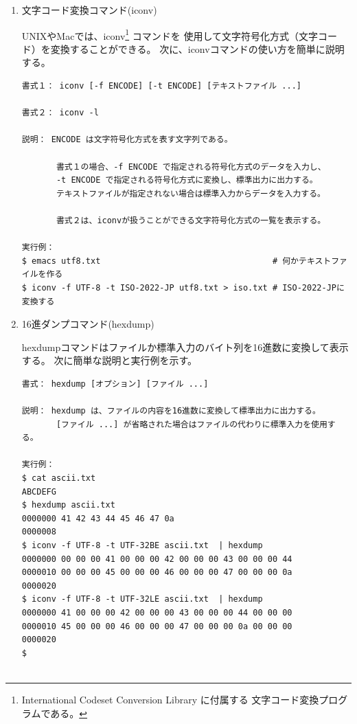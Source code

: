 \documentclass[a4j,dvipdfmx]{jarticle}
\begin{document}
\begin{enumerate}
\begin{enumerate}
\end{enumerate}

\newpage

\item 文字コード変換コマンド(iconv)

UNIXやMacでは、iconv\footnote{
International Codeset Conversion Library に付属する
文字コード変換プログラムである。
}%
コマンドを
使用して文字符号化方式（文字コード）を変換することができる。
次に、iconvコマンドの使い方を簡単に説明する。

\begin{lstlisting}[numbers=none]
書式１： iconv [-f ENCODE] [-t ENCODE] [テキストファイル ...]

書式２： iconv -l

説明： ENCODE は文字符号化方式を表す文字列である。

       書式１の場合、-f ENCODE で指定される符号化方式のデータを入力し、
       -t ENCODE で指定される符号化方式に変換し、標準出力に出力する。
       テキストファイルが指定されない場合は標準入力からデータを入力する。

       書式２は、iconvが扱うことができる文字符号化方式の一覧を表示する。

実行例：
$ emacs utf8.txt                                   # 何かテキストファイルを作る
$ iconv -f UTF-8 -t ISO-2022-JP utf8.txt > iso.txt # ISO-2022-JPに変換する
\end{lstlisting}

\item 16進ダンプコマンド(hexdump)

hexdumpコマンドはファイルか標準入力のバイト列を16進数に変換して表示する。
次に簡単な説明と実行例を示す。

\begin{lstlisting}[numbers=none]
書式： hexdump [オプション] [ファイル ...]

説明： hexdump は、ファイルの内容を16進数に変換して標準出力に出力する。
       [ファイル ...] が省略された場合はファイルの代わりに標準入力を使用する。

実行例：
$ cat ascii.txt 
ABCDEFG
$ hexdump ascii.txt 
0000000 41 42 43 44 45 46 47 0a                        
0000008
$ iconv -f UTF-8 -t UTF-32BE ascii.txt  | hexdump
0000000 00 00 00 41 00 00 00 42 00 00 00 43 00 00 00 44
0000010 00 00 00 45 00 00 00 46 00 00 00 47 00 00 00 0a
0000020
$ iconv -f UTF-8 -t UTF-32LE ascii.txt  | hexdump 
0000000 41 00 00 00 42 00 00 00 43 00 00 00 44 00 00 00
0000010 45 00 00 00 46 00 00 00 47 00 00 00 0a 00 00 00
0000020
$


\end{lstlisting}
\end{enumerate}
\end{document}
